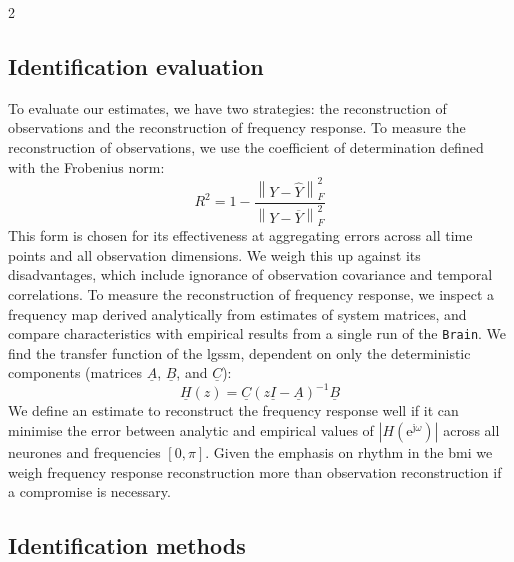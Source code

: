 \documentclass[a4paper, 10pt]{article}
\newcommand{\Brain}{\texttt{Brain}\xspace}
\newcommand{\LGSSM}{\ac{lgssm}\xspace}
\newcommand{\BMI}{\ac{bmi}\xspace}
\begin{document}
\begin{multicols*}{2}
  \subsection*{Identification evaluation}

  To evaluate our estimates, we have two strategies: the reconstruction of
  observations and the reconstruction of frequency response. To measure the
  reconstruction of observations, we use the coefficient of determination
  defined with the Frobenius norm:
  \begin{equation*}
    R^2 = 1 - \frac{\left\lVert Y - \hat{Y} \right\rVert_F^2}{\left\lVert Y - \overline{Y} \right\rVert_F^2}
  \end{equation*}
  This form is chosen for its effectiveness at aggregating errors across all
  time points and all observation dimensions. We weigh this up against its
  disadvantages, which include ignorance of observation covariance and temporal
  correlations. To measure the reconstruction of frequency response, we inspect
  a frequency map derived analytically from estimates of system matrices, and
  compare characteristics with empirical results from a single run of the
  \Brain. We find the transfer function of the \LGSSM, dependent on only the
  deterministic components (matrices $\underline{A}$, $\underline{B}$, and
  $\underline{C}$):
  \begin{equation*}
    \underline{H}(z) = \underline{C} \left(z\underline{I} - \underline{A}\right)^{-1}\underline{B}
  \end{equation*}
  We define an estimate to reconstruct the frequency response well if it can
  minimise the error between analytic and empirical values of
  $|H(\mathrm{e}^{\mathrm{j}\omega})|$ across all neurones and frequencies $[0,
        \pi]$. Given the emphasis on rhythm in the \BMI we weigh frequency response
  reconstruction more than observation reconstruction if a compromise is
  necessary.

  \subsection*{Identification methods}


\end{multicols*}
\end{document}
